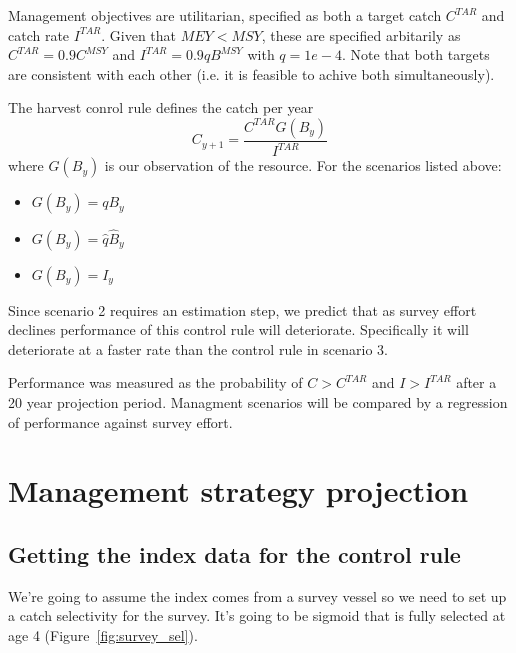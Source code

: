 \documentclass[a4paper]{article}
\begin{document}
Management objectives are utilitarian, specified as both a target catch $C^{TAR}$ and catch rate $I^{TAR}$. 
Given that $MEY < MSY$, these are specified arbitarily as $C^{TAR} = 0.9 C^{MSY}$ and $I^{TAR} = 0.9 q B^{MSY}$ with $q=1e-4$.
Note that both targets are consistent with each other (i.e. it is feasible to achive both simultaneously).

The harvest conrol rule defines the catch per year
\[
C_{y+1} = \frac{C^{TAR}G(B_y)}{I^{TAR}}
\]
where $G(B_y)$ is our observation of the resource. For the scenarios listed above:
\begin{itemize}
\item $G(B_y) = qB_y$
\item $G(B_y) = \hat{q}\hat{B}_y$
\item $G(B_y) = I_y$
\end{itemize}

Since scenario 2 requires an estimation step, we predict that as survey effort declines performance of this control rule will deteriorate.
Specifically it will deteriorate at a faster rate than the control rule in scenario 3.

Performance was measured as the probability of $C>C^{TAR}$ and $I>I^{TAR}$ after a 20 year projection period. Managment scenarios will
be compared by a regression of performance against survey effort. 

\section{Management strategy projection}


\subsection{Getting the index data for the control rule}

We're going to assume the index comes from a
survey vessel so we need to set up a catch selectivity for the survey.
It's going to be sigmoid that is fully selected at age 4 (Figure~\ref{fig:survey_sel}).
\end{document}
